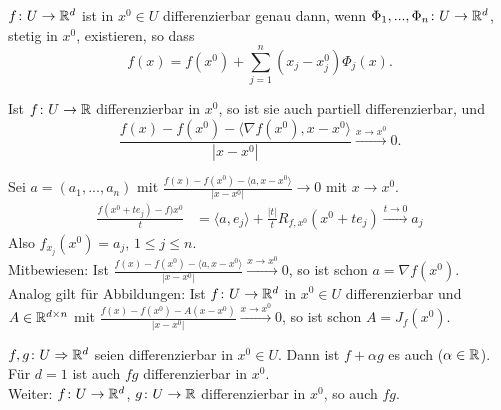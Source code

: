 \begin{lemma}
	$ f\colon U\rightarrow\mathbb{R}^d $ ist in $ x^0\in U $ differenzierbar genau dann, wenn $ \Phi_1,...,\Phi_n\colon U\rightarrow\mathbb{R}^d $, stetig in $ x^0 $, existieren, so dass
	\[ f(x)=f(x^0)+\sum_{j=1}^{n}(x_j-x_j^0)\Phi_j(x). \]
\end{lemma}
\begin{lemma}
	Ist $ f\colon U\rightarrow\mathbb{R} $ differenzierbar in $ x^0 $, so ist sie auch partiell differenzierbar, und
	\[ \frac{f(x)-f(x^0)-\langle\nabla f(x^0),x-x^0\rangle}{|x-x^0|}\xrightarrow{x\to x^0}0. \]
\end{lemma}
\begin{beweis}
	Sei $ a=(a_1,...,a_n) $ mit $ \frac{f(x)-f(x^0)- \langle a,x-x^0\rangle}{|x-x^0|}\rightarrow 0 $ mit $ x\to x^0 $.
	\begin{align*}
	\frac{f(x^0+te_j)-f)x^0}{t}&=\langle a,e_j\rangle+\frac{|t|}{t}R_{f,x^0}(x^0+te_j)\xrightarrow{t\to 0}a_j
	\end{align*}
	Also $ f_{x_j}(x^0)=a_j $, $ 1\leq j\leq n $.\\
	Mitbewiesen: Ist $ \frac{f(x)-f(x^0)-\langle a,x-x^0\rangle}{|x-x^0|}\xrightarrow{x\to x^0}0 $, so ist schon $ a=\nabla f(x^0) $.\\
	Analog gilt f\"ur Abbildungen: Ist $ f\colon U\rightarrow\mathbb{R}^d $ in $ x^0\in U $ differenzierbar und $ A\in\mathbb{R}^{d\times n} $ mit $ \frac{f(x)-f(x^0)-A(x-x^0)}{|x-x^0|}\xrightarrow{x\to x^0}0 $, so ist schon $ A=J_f(x^0) $.
\end{beweis}
\begin{lemma}
	$ f,g\colon U\Rightarrow\mathbb{R}^d $ seien differenzierbar in $ x^0\in U $. Dann ist $ f+\alpha g$ es auch ($ \alpha\in\mathbb{R} $).\\
	F\"ur $ d=1 $ ist auch $ fg $ differenzierbar in $ x^0 $.\\
	Weiter: $ f\colon U\rightarrow\mathbb{R}^d $, $ g\colon U\rightarrow\mathbb{R} $ differenzierbar in $ x^0 $, so auch $ fg $.
\end{lemma}
\vspace{-22pt}
